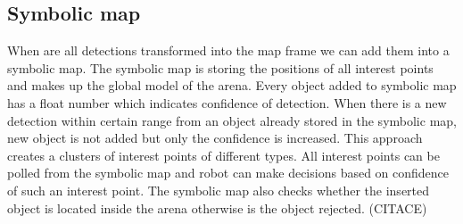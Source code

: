 \subsection{Symbolic map}
When are all detections transformed into the map frame we can add them into a symbolic map. The symbolic map is storing the positions of all interest points and makes up the global model of the arena. Every object added to symbolic map has a float number which indicates confidence of detection. When there is a new detection within certain range from an object already stored in the symbolic map, new object is not added but only the confidence is increased. This approach creates a clusters of interest points of different types. All interest points can be polled from the symbolic map and robot can make decisions based on confidence of such an interest point. The symbolic map also checks whether the inserted object is located inside the arena otherwise is the object rejected. (CITACE)